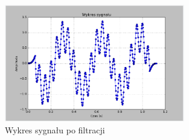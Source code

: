 \documentclass{article}
\begin{document}
{{            \begin{figure}[h!]
                \centering
                \includegraphics[width=0.7\textwidth]{img/fil22.png}
                \caption{Wykres sygnału po filtracji}
            \end{figure}
            \FloatBarrier
        }
        \newpage

}
\end{document}
